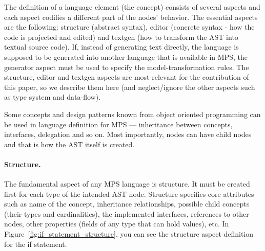 The definition of a language element (the concept) consists of several aspects and each aspect codifies a different part of the nodes' behavior. The essential aspects are the following: structure (abstract syntax), editor (concrete syntax - how the code is projected and edited) and textgen (how to transform the AST into textual source code). If, instead of generating text directly, the language is supposed to be generated into another language that is available in MPS, the generator aspect must be used to specify the model-transformation rules. The structure, editor and textgen aspects are most relevant for the contribution of this paper, so we describe them here (and neglect/ignore the other aspects such as type system and data-flow).


Some concepts and design patterns known from object oriented programming can be used in language definition for MPS --- inheritance between concepts, interfaces, delegation and so on. Most importantly, nodes can have child nodes and that is how the AST itself is created.

 

\paragraph{Structure.}
 The fundamental aspect of any MPS language is structure. It must be created first for each type of the intended AST node. Structure specifies core attributes such as name of the concept, inheritance relationships, possible child concepts (their types and cardinalities), the implemented interfaces, references to other nodes, other properties (fields of any type that can hold values), etc.
In Figure~\ref{fig:if_statement_structure}, you can see the structure aspect definition for the if statement.

